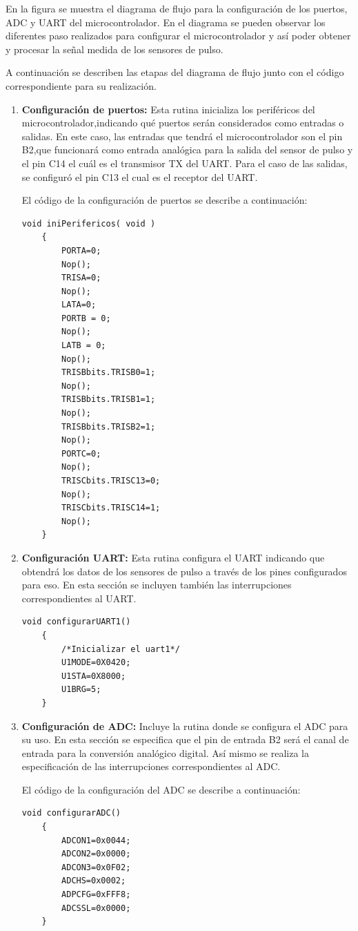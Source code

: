 En la figura se muestra el diagrama de flujo para la configuración de los puertos, ADC y UART del microcontrolador. En el diagrama se pueden observar los diferentes paso realizados para configurar el microcontrolador y así poder obtener y procesar la señal medida de los sensores de pulso.

A continuación se describen las etapas del diagrama de flujo junto con el código correspondiente para su realización.

\begin{enumerate}
	\item \textbf{Configuración de puertos:} Esta rutina inicializa los periféricos del microcontrolador,indicando qué puertos serán considerados como entradas o salidas. En este caso, las entradas que tendrá el microcontrolador son el pin B2,que funcionará como entrada analógica para la salida del sensor de pulso y el pin C14 el cuál es el transmisor TX del UART. Para el caso de las salidas, se configuró el pin C13 el cual es el receptor del UART. 
	
	\lstset{language=c}
	El código de la configuración de puertos se describe a continuación:
	\begin{lstlisting}[frame=single]
	void iniPerifericos( void )
	{
		PORTA=0;
		Nop();
		TRISA=0;
		Nop();
		LATA=0;
		PORTB = 0;
		Nop();
		LATB = 0;
		Nop();
		TRISBbits.TRISB0=1;
		Nop();
		TRISBbits.TRISB1=1;
		Nop();
		TRISBbits.TRISB2=1;
		Nop();
		PORTC=0;
		Nop();
		TRISCbits.TRISC13=0;
		Nop();
		TRISCbits.TRISC14=1;
		Nop();
	}
	\end{lstlisting}
	
	
	\item \textbf{Configuración UART:} Esta rutina configura el UART indicando que obtendrá los datos de los sensores de pulso a través de los pines configurados para eso. En esta sección se incluyen también las interrupciones correspondientes al UART.
	\begin{lstlisting}[frame=single]
	void configurarUART1()
	{
		/*Inicializar el uart1*/
		U1MODE=0X0420;
		U1STA=0X8000;
		U1BRG=5;
	}
	\end{lstlisting}
	
	\item \textbf{Configuración de ADC:} Incluye la rutina donde se configura el ADC para su uso. En esta sección se especifica que el pin de entrada B2 será el canal de entrada para la conversión analógico digital. Así mismo se realiza la especificación de las interrupciones correspondientes al ADC.
	
	\lstset{language=c}
	El código de la configuración del ADC se describe a continuación:
	\begin{lstlisting}[frame=single]
	void configurarADC()
	{
		ADCON1=0x0044;
		ADCON2=0x0000;
		ADCON3=0x0F02;
		ADCHS=0x0002;
		ADPCFG=0xFFF8;
		ADCSSL=0x0000;
	}
	\end{lstlisting}

\end{enumerate}

